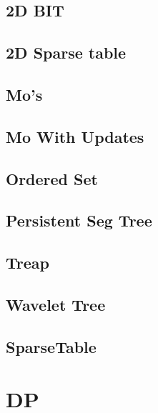 \subsection{2D BIT}
\raggedbottom
\hrulefill
\subsection{2D Sparse table}
\raggedbottom
\hrulefill
\subsection{Mo's}
\raggedbottom
\hrulefill
\subsection{Mo With Updates}
\raggedbottom
\hrulefill
\subsection{Ordered Set}
\raggedbottom
\hrulefill
\subsection{Persistent Seg Tree}
\raggedbottom
\hrulefill
\subsection{Treap}
\raggedbottom
\hrulefill
\subsection{Wavelet Tree}
\raggedbottom
\hrulefill
\subsection{SparseTable}
\raggedbottom
\hrulefill

\section{DP}
